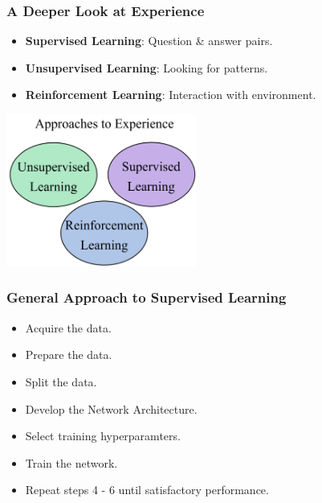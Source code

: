\documentclass{beamer}
\begin{document}
\begin{frame}

    \frametitle{A Deeper Look at Experience}

    \begin{itemize}
        \item \textbf{Supervised Learning}: Question \& answer pairs.
        \item \textbf{Unsupervised Learning}: Looking for patterns.
        \item \textbf{Reinforcement Learning}: Interaction with environment.
    \end{itemize}

    \begin{center}
        \includegraphics[height=5cm]{figs/experience.png}
    \end{center}

\end{frame}


\begin{frame}

    \frametitle{General Approach to Supervised Learning}

    \begin{itemize}
        \item Acquire the data.
        \item Prepare the data.
        \item Split the data.
        \item Develop the Network Architecture.
        \item Select training hyperparamters.
        \item Train the network.
        \item Repeat steps 4 - 6 until satisfactory performance.
    \end{itemize}

\end{frame}
\end{document}
